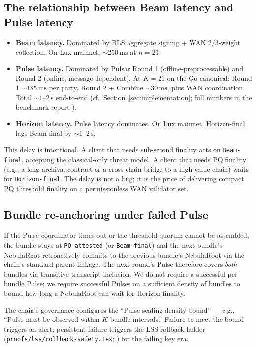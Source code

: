 \subsection{The relationship between Beam latency and Pulse latency}

\begin{itemize}[leftmargin=2em,nosep]
  \item \textbf{Beam latency.} Dominated by BLS aggregate signing + WAN $2/3$-weight collection. On Lux mainnet, $\sim 250\,\mathrm{ms}$ at $n=21$.
  \item \textbf{Pulse latency.} Dominated by Pulsar Round 1 (offline-preprocessable) and Round 2 (online, message-dependent). At $K = 21$ on the Go canonical: Round 1 $\sim 185\,\mathrm{ms}$ per party, Round 2 + Combine $\sim 30\,\mathrm{ms}$, plus WAN coordination. Total $\sim 1$--$2\,\mathrm{s}$ end-to-end (cf.\ Section~\ref{sec:implementation}; full numbers in the benchmark report \cite{luxbenchmarks}).
  \item \textbf{Horizon latency.} Pulse latency dominates. On Lux mainnet, Horizon-final lags Beam-final by $\sim 1$--$2\,\mathrm{s}$.
\end{itemize}

This delay is intentional. A client that needs sub-second finality acts on \texttt{Beam-final}, accepting the classical-only threat model. A client that needs PQ finality (e.g., a long-archival contract or a cross-chain bridge to a high-value chain) waits for \texttt{Horizon-final}. The delay is not a bug; it is the price of delivering compact PQ threshold finality on a permissionless WAN validator set.

\subsection{Bundle re-anchoring under failed Pulse}

If the Pulse coordinator times out or the threshold quorum cannot be assembled, the bundle stays at \texttt{PQ-attested} (or \texttt{Beam-final}) and the next bundle's NebulaRoot retroactively commits to the previous bundle's NebulaRoot via the chain's standard parent linkage. The next round's Pulse therefore covers \emph{both} bundles via transitive transcript inclusion. We do not require a successful per-bundle Pulse; we require successful Pulses on a sufficient density of bundles to bound how long a NebulaRoot can wait for Horizon-finality.

The chain's governance configures the ``Pulse-sealing density bound'' --- e.g., ``Pulse must be observed within $K$ bundle intervals.'' Failure to meet the bound triggers an alert; persistent failure triggers the LSS rollback ladder (\texttt{proofs/lss/rollback-safety.tex}; \cite{luxlssmpc,lp077}) for the failing key era.

